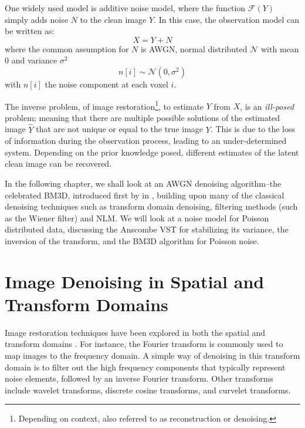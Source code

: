 One widely used model is additive noise model, where the function $\mathcal{F}(Y)$ simply adds noise $N$ to the clean image $Y$. In this case, the observation model can be written as:
\begin{equation}\label{eq:observation-model-additive}
    X = Y + N
\end{equation}
where the common assumption for $N$ is \gls{AWGN}, normal distributed $\mathcal{N}$ with mean \num{0} and variance $\sigma^2$
\begin{equation}\label{eq:awgn}
    n[i] \sim \mathcal{N}(0, \sigma^2)
\end{equation}
with $n[i]$ the noise component at each voxel $i$.

The inverse problem, of image restoration\footnote{Depending on context, also referred to as reconstruction or denoising.}, to estimate $Y$ from $X$, is an \textit{ill-posed} problem; meaning that there are multiple possible solutions of the estimated image $\hat{Y}$ that are not unique or equal to the true image $Y$. This is due to the loss of information during the observation process, leading to an under-determined system. Depending on the prior knowledge posed, different estimates of the latent clean image can be recovered.

In the following chapter, we shall look at an \gls{AWGN} denoising algorithm--the celebrated \gls{BM3D}, introduced first by \citeauthor{dabovImageDenoisingSparse2007} in \cite{dabovImageDenoisingSparse2007}, building upon many of the classical denoising techniques such as transform domain denoising, filtering methods (such as the Wiener filter) and \gls{NLM}. We will look at a noise model for Poisson distributed data, discussing the Anscombe \gls{VST} for stabilizing its variance, the inversion of the transform, and the \gls{BM3D} algorithm for Poisson noise.

\section{Image Denoising in Spatial and Transform Domains}
Image restoration techniques have been explored in both the spatial and transform domains \cite{buadesReviewImageDenoising2005,diwakarReviewCTImage2018}. For instance, the Fourier transform is commonly used to map images to the frequency domain. A simple way of denoising in this transform domain is to filter out the high frequency components that typically represent noise elements, followed by an inverse Fourier transform. Other transforms include wavelet transforms, discrete cosine transforms, and curvelet transforms.

